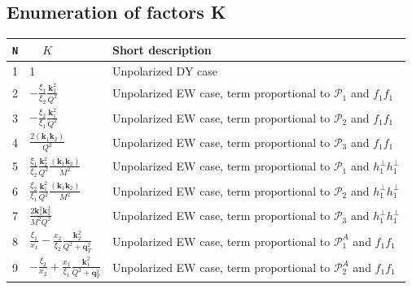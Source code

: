 \documentclass[prd,nofootinbib,eqsecnum,final]{revtex4}
\newcommand{\Ds}{\displaystyle}
\renewcommand{\(}{\left(}
\renewcommand{\)}{\right)}
\renewcommand{\[}{\left[}
\renewcommand{\]}{\right]}
\renewcommand{\vec}[1]{\bm{#1}}
\begin{document}
\subsection{Enumeration of factors K}

\begin{longtable}{||l|p{6cm}|p{9cm}||}
\hline\hline
\texttt{N} & ~~$K$~~& Short description 
\\\hline
1 & 1 & Unpolarized DY case
\\\hline
2 & $\Ds -\frac{\xi_1}{\xi_2}\frac{\vec k_2^2}{Q^2}$ & Unpolarized EW case, term proportional to $\mathcal{P}_1$ and $f_1f_1$
\\\hline
3 & $\Ds -\frac{\xi_2}{\xi_1}\frac{\vec k_1^2}{Q^2}$ & Unpolarized EW case, term proportional to $\mathcal{P}_2$ and $f_1f_1$
\\\hline
4 & $\Ds \frac{2(\vec k_1\vec k_2)}{Q^2}$ & Unpolarized EW case, term proportional to $\mathcal{P}_3$ and $f_1f_1$
\\\hline
5 & $\Ds \frac{\xi_1}{\xi_2}\frac{\vec k_2^2}{Q^2}\frac{(\vec k_1\vec k_2)}{M^2}$ & Unpolarized EW case, term proportional to $\mathcal{P}_1$ and $h_1^\perp h_1^\perp$
\\\hline
6 & $\Ds \frac{\xi_2}{\xi_1}\frac{\vec k_1^2}{Q^2}\frac{(\vec k_1\vec k_2)}{M^2}$ & Unpolarized EW case, term proportional to $\mathcal{P}_2$ and $h_1^\perp h_1^\perp$
\\\hline
7 & $\Ds \frac{2 \vec k_1^2 \vec k_2^2}{M^2Q^2}$ & Unpolarized EW case, term proportional to $\mathcal{P}_3$ and $h_1^\perp h_1^\perp$
\\\hline
8 & $\Ds \frac{\xi_1}{x_1}-\frac{x_2}{\xi_2}\frac{\vec k_2^2}{Q^2+\vec q_T^2}$ & Unpolarized EW case, term proportional to $\mathcal{P}_1^A$ and $f_1f_1$
\\\hline
9 & $\Ds -\frac{\xi_2}{x_2}+\frac{x_1}{\xi_1}\frac{\vec k_1^2}{Q^2+\vec q_T^2}$ & Unpolarized EW case, term proportional to $\mathcal{P}_2^A$ and $f_1f_1$
\\\hline\hline
\end{longtable}
\end{document}
